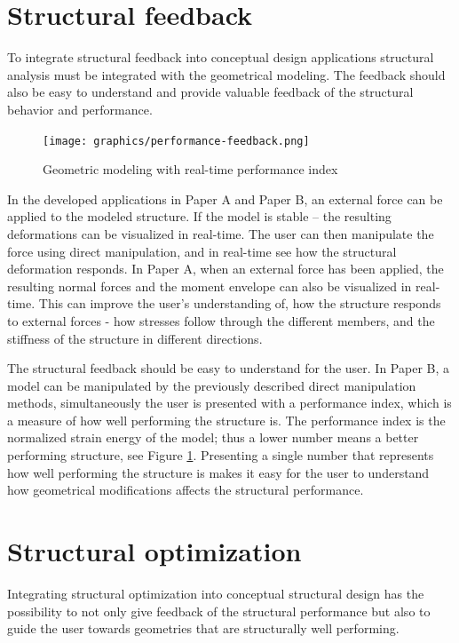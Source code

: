 \section{Structural feedback}
To integrate structural feedback into conceptual design applications structural analysis must be integrated with the geometrical modeling. The feedback should also be easy to understand and provide valuable feedback of the structural behavior and performance.

\begin{figure}
  \texttt{[image: graphics/performance-feedback.png]}
  \caption{Geometric modeling with real-time performance index}
  \label{fig:performance-feedback}
\end{figure}

In the developed applications in Paper A and Paper B, an external force can be applied to the modeled structure. If the model is stable – the resulting deformations can be visualized in real-time. The user can then manipulate the force using direct manipulation, and in real-time see how the structural deformation responds. In Paper A, when an external force has been applied, the resulting normal forces and the moment envelope can also be visualized in real-time. This can improve the user’s understanding of, how the structure responds to external forces - how stresses follow through the different members, and the stiffness of the structure in different directions.

The structural feedback should be easy to understand for the user. In Paper B, a model can be manipulated by the previously described direct manipulation methods, simultaneously the user is presented with a performance index, which is a measure of how well performing the structure is. The performance index is the normalized strain energy of the model; thus a lower number means a better performing structure, see Figure \ref{fig:performance-feedback}. Presenting a single number that represents how well performing the structure is makes it easy for the user to understand how geometrical modifications affects the structural performance.


\section{Structural optimization}
Integrating structural optimization into conceptual structural design has the possibility to not only give feedback of the structural performance but also to guide the user towards geometries that are structurally well performing. 

